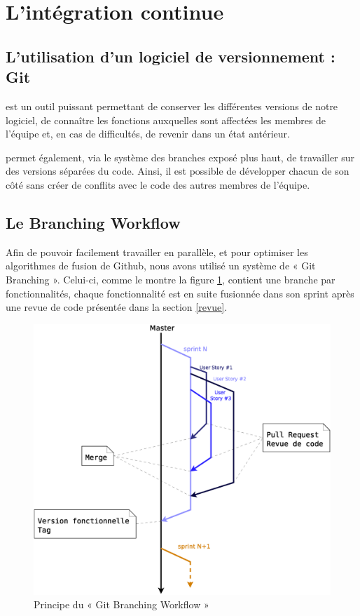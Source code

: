 \section{L'intégration continue}\label{integration-continue}
\subsection{L'utilisation d'un logiciel de versionnement : Git}
 est un outil puissant permettant de conserver les différentes versions de notre logiciel, de connaître les fonctions auxquelles sont affectées les membres de l'équipe et, en cas de difficultés, de revenir dans un état antérieur. 

 permet également, via le système des branches exposé plus haut, de travailler sur des versions séparées du code. Ainsi, il est possible de développer chacun de son côté sans créer de conflits avec le code des autres membres de l'équipe. 

\subsection{Le Branching Workflow}
Afin de pouvoir facilement travailler en parallèle, et pour optimiser les algorithmes de fusion de Github, nous avons utilisé un système de « Git
Branching ». Celui-ci, comme le montre la figure \ref{fig:branching}, contient une branche par fonctionnalités, chaque fonctionnalité est en suite
fusionnée dans son sprint après une revue de code présentée dans la section \ref{revue}.
\begin{figure}[H]
	\centering
	\includegraphics*[width=13cm]{BranchingWorkflow.eps}
	\caption{Principe du « Git Branching Workflow »}
	\label{fig:branching}
\end{figure}

